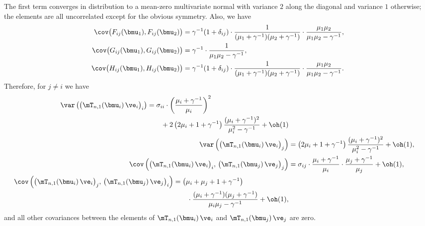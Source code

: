 The first term converges in distribution to a mean-zero multivariate normal
with variance $2$ along the diagonal and variance $1$ otherwise; the elements
are all uncorrelated except for the obvious symmetry.  Also, we have
\begin{align*}
    \cov\big( F_{ij} ( \bmu_1 ), F_{ij} ( \bmu_2 ) \big)
        &= 
        \gamma^{-1} ( 1 + \delta_{ij} )
        \cdot
        \frac{1}{ ( \mu_1 + \gamma^{-1} ) ( \mu_2 + \gamma^{-1} ) }
        \cdot
        \frac{ \mu_1 \mu_2 }{ \mu_1 \mu_2 - \gamma^{-1} }, \\
    \cov\big( G_{ij} ( \bmu_1 ), G_{ij} ( \bmu_2 ) \big)
        &= 
        \gamma^{-1} 
        \cdot
        \frac{1}{ \mu_1 \mu_2 - \gamma^{-1} }, \\
    \cov\big( H_{ij} ( \bmu_1 ), H_{ij} ( \bmu_2 ) \big)
        &= 
        \gamma^{-1} ( 1 + \delta_{ij} )
        \cdot
        \frac{1}{ ( \mu_1 + \gamma^{-1} ) ( \mu_2 + \gamma^{-1} ) }
        \cdot
        \frac{ \mu_1 \mu_2 }{ \mu_1 \mu_2 - \gamma^{-1} }.
\end{align*}
Therefore, for $j \neq i$ we have
\begin{align*}
    \begin{split}
    \var \left(
        \big(
            \mT_{n,1}( \bmu_i ) \,
            \ve_i
        \big)_i
    \right)
        &= 
        \sigma_{ii}
        \cdot
        \left(
            \frac{\mu_i + \gamma^{-1}}{\mu_i}
        \right)^2 \\
        &\qquad+
        2
        \left(
            2 \mu_i + 1 + \gamma^{-1}
        \right)
        \frac{ (\mu_i + \gamma^{-1})^2 }
             { \mu_i^2 - \gamma^{-1} } + \oh(1)
    \end{split} \\
    \var \left(
        \big(
            \mT_{n,1}( \bmu_i ) \,
            \ve_i
        \big)_j
    \right)
        &=
        \left(
            2 \mu_i + 1 + \gamma^{-1}
        \right)
        \frac{ (\mu_i + \gamma^{-1})^2 }
             { \mu_i^2 - \gamma^{-1} } + \oh(1), \\
    \cov \left( 
        \big(
            \mT_{n,1}( \bmu_i ) \,
            \ve_i
        \big)_i, \,
        \big(
            \mT_{n,1}( \bmu_j ) \,
            \ve_j
        \big)_j
    \right)
        &=
        \sigma_{ij}
        \cdot
        \frac{\mu_i + \gamma^{-1}}{ \mu_i }
        \cdot
        \frac{\mu_j + \gamma^{-1}}{ \mu_j } + \oh(1), \\
    \begin{split}
    \cov \left(
        \big(
            \mT_{n,1}( \bmu_i ) \,
            \ve_i
        \big)_j, \,
        \big(
            \mT_{n,1}( \bmu_j ) \,
            \ve_j
        \big)_i    
    \right)
        &=
        \left(
            \mu_i + \mu_j + 1 + \gamma^{-1}
        \right) \\
        &\qquad \cdot
            \frac{ ( \mu_i + \gamma^{-1} )( \mu_j + \gamma^{-1} ) }
                 { \mu_i \mu_j - \gamma^{-1} }
        + \oh(1),
    \end{split}
\end{align*}
and all other covariances between the elements of
$\mT_{n,1}(\bmu_i) \, \ve_i$ and $\mT_{n,1}(\bmu_j) \, \ve_j$ are zero.

